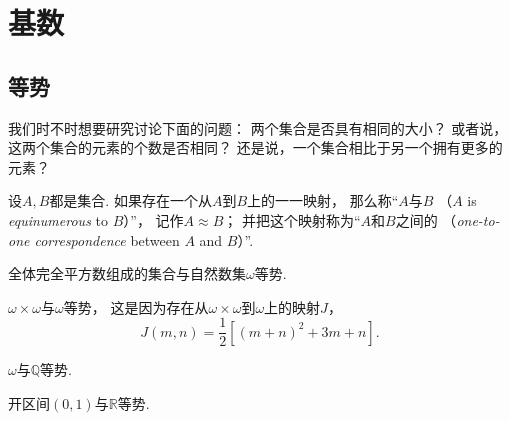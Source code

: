 \section{基数}
\subsection{等势}
我们时不时想要研究讨论下面的问题：
两个集合是否具有相同的大小？
或者说，这两个集合的元素的个数是否相同？
还是说，一个集合相比于另一个拥有更多的元素？

\begin{definition}
设\(A,B\)都是集合.
如果存在一个从\(A\)到\(B\)上的一一映射，
那么称“\(A\)与\(B\) （\(A\) is \emph{equinumerous} to \(B\)）”，
记作\(A \approx B\)；
并把这个映射称为“\(A\)和\(B\)之间的%
（\emph{one-to-one correspondence} between \(A\) and \(B\)）”.
\end{definition}

\begin{example}
全体完全平方数组成的集合与自然数集\(\omega\)等势.
\end{example}

\begin{example}
\(\omega\times\omega\)与\(\omega\)等势，
这是因为存在从\(\omega\times\omega\)到\(\omega\)上的映射\(J\)，
\[
	J(m,n) = \frac{1}{2} [(m+n)^2+3m+n].
\]
\end{example}

\begin{example}
\(\omega\)与\(\mathbb{Q}\)等势.
\end{example}

\begin{example}
开区间\((0,1)\)与\(\mathbb{R}\)等势.
\end{example}
